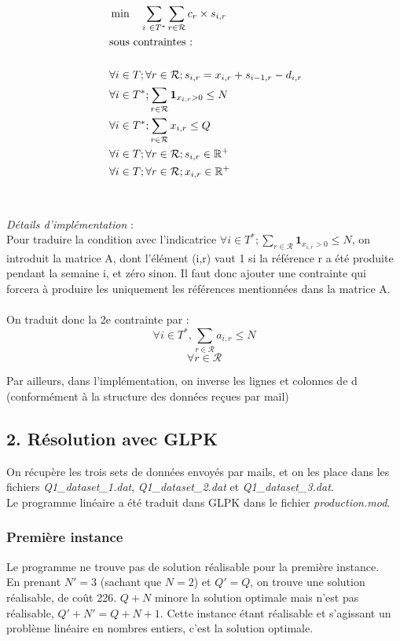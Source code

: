 \documentclass{rapport}
\begin{document}
\begin{equation*}
\begin{aligned}
& \min \ \ \  \sum_{i \in T^*} \sum_{r \in \mathcal{R}} c_r \times s_{i, r} \\
& \text{sous contraintes : } \\
\ \\
& \forall i \in T; \forall r \in \mathcal{R}; s_{i,r} = x_{i,r} + s_{i-1,r} - d_{i, r}\\
& \forall i \in T^*; \sum_{r \in \mathcal{R}} \mathbf{1}_{x_{i, r} > 0} \le N \\
& \forall i \in T^*; \sum_{r \in \mathcal{R}} x_{i, r} \le Q \\
& \forall i \in T; \forall r \in \mathcal{R}; s_{i, r} \in \R^+ \\
& \forall i \in T; \forall r \in \mathcal{R}; x_{i, r} \in \R^+
\end{aligned}
\end{equation*}
\ \\
\ \\
\emph{Détails d'implémentation} : \\
Pour traduire la condition avec l'indicatrice $\forall i \in T^*; \sum_{r \in \mathcal{R}} \mathbf{1}_{x_{i, r} > 0} \le N$, on introduit la matrice A, dont l'élément (i,r) vaut 1 si la référence r a été produite pendant la semaine i, et zéro sinon. Il faut donc ajouter une contrainte qui forcera à produire les uniquement les références mentionnées dans la matrice A. \\
\ \\
On traduit donc la 2e contrainte par :
$$\forall i \in T^*, \sum_{r \in \mathcal{R}}a_{i,r} \le N $$
$$\forall r \in \mathcal{R} $$

Par ailleurs, dans l'implémentation, on inverse les lignes et colonnes de d (conformément à la structure des données reçues par mail)

\subsection{2. Résolution avec GLPK}
On récupère les trois sets de données envoyés par mails, et on les place dans les fichiers \emph{Q1\_dataset\_1.dat}, \emph{Q1\_dataset\_2.dat} et \emph{Q1\_dataset\_3.dat}. \\
Le programme linéaire a été traduit dans GLPK dans le fichier \emph{production.mod}.
\ \\
\subsubsection{Première instance}
Le programme ne trouve pas de solution réalisable pour la première instance. \ \\
En prenant $N'=3$ (sachant que $N=2$) et $Q'=Q$, on trouve une solution réalisable, de coût 226. $Q+N$ minore la solution optimale mais n'est pas réalisable, $Q'+N'=Q+N+1$. Cette instance étant réalisable et s'agissant un problème linéaire en nombres entiers, c'est la solution optimale. \\
\end{document}
